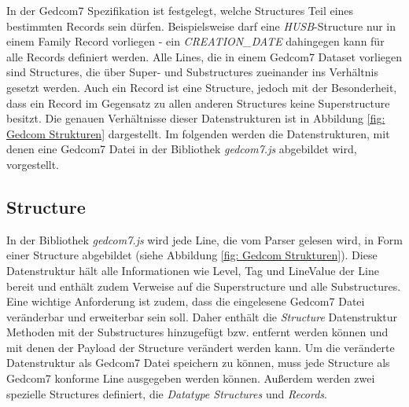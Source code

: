 In der Gedcom7 Spezifikation ist festgelegt, welche Structures Teil eines bestimmten Records sein dürfen. Beispielsweise darf eine \textit{HUSB}-Structure nur in einem Family Record vorliegen - ein \textit{CREATION\_DATE} dahingegen kann für alle Records definiert werden. Alle Lines, die in einem Gedcom7 Dataset vorliegen sind Structures, die über Super- und Substructures zueinander ins Verhältnis gesetzt werden. Auch ein Record ist eine Structure, jedoch mit der Besonderheit, dass ein Record im Gegensatz zu allen anderen Structures keine Superstructure besitzt. Die genauen Verhältnisse dieser Datenstrukturen ist in Abbildung \ref{fig: Gedcom Strukturen} dargestellt. Im folgenden werden die Datenstrukturen, mit denen eine Gedcom7 Datei in der Bibliothek \textit{gedcom7.js} abgebildet wird, vorgestellt.
\newpage
\subsection{Structure}
\label{subsec: Konzept - Gedcom Strukturen - Structure}
In der Bibliothek \textit{gedcom7.js} wird jede Line, die vom Parser gelesen wird, in Form einer Structure abgebildet (siehe Abbildung \ref{fig: Gedcom Strukturen}). Diese Datenstruktur hält alle Informationen wie Level, Tag und LineValue der Line bereit und enthält zudem Verweise auf die Superstructure und alle Substructures. Eine wichtige Anforderung ist zudem, dass die eingelesene Gedcom7 Datei veränderbar und erweiterbar sein soll. Daher enthält die \textit{Structure} Datenstruktur Methoden mit der Substructures hinzugefügt bzw. entfernt werden können und mit denen der Payload der Structure verändert werden kann. Um die veränderte Datenstruktur als Gedcom7 Datei speichern zu können, muss jede Structure als Gedcom7 konforme Line ausgegeben werden können. Außerdem werden zwei spezielle Structures definiert, die \textit{Datatype Structures} und \textit{Records}.

